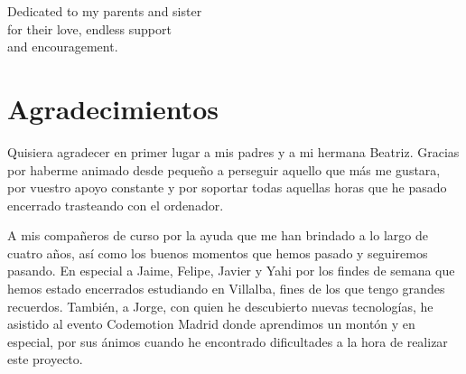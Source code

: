 \documentclass[a4paper,11pt,oneside]{report}
\newenvironment{dedication}
  {
     \thispagestyle{empty}
     \vspace*{\stretch{1}}
     \hfill\begin{minipage}[t]{0.66\textwidth}
     \raggedright
  }
  {
     \end{minipage}
     \vspace*{\stretch{3}}
  }
\begin{document}







\begin{dedication}
Dedicated to my parents and sister \\
for their love, endless support \\
and encouragement.
\end{dedication}


\chapter*{Agradecimientos} %

Quisiera agradecer en primer lugar a mis padres y a mi hermana Beatriz. Gracias por haberme animado desde pequeño a perseguir aquello que más me gustara, por vuestro apoyo constante y por soportar todas aquellas horas que he pasado encerrado trasteando con el ordenador.

A mis compañeros de curso por la ayuda que me han brindado a lo largo de cuatro años, así como los buenos momentos que hemos pasado y seguiremos pasando. En especial a Jaime, Felipe, Javier y Yahi por los findes de semana que hemos estado encerrados estudiando en Villalba, fines de los que tengo grandes recuerdos. También, a Jorge, con quien he descubierto nuevas tecnologías, he asistido al evento Codemotion Madrid donde aprendimos un montón y en especial, por sus ánimos cuando he encontrado dificultades a la hora de realizar este proyecto.
\end{document}
